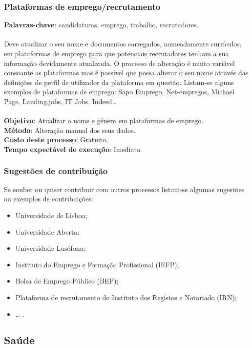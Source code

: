 \subsubsection{Plataformas de emprego/recrutamento}

\textbf{Palavras-chave}: candidaturas, emprego, trabalho, recrutadores. \\
\\
Deve atualizar o seu nome e documentos carregados, nomeadamente
currículos, em plataformas de emprego para que potenciais recrutadores
tenham a sua informação devidamente atualizada. O processo de alteração
é muito variável consoante as plataformas mas é possível que possa
alterar o seu nome através das definições de perfil de utilizador da
plataforma em questão. Listam-se alguns exemplos de plataformas de
emprego: Sapo Emprego, Net-empregos, Michael Page, Landing.jobs, IT
Jobs, Indeed\ldots{} \\
\\
\textbf{Objetivo}: Atualizar o nome e género em plataformas de emprego. \\
\textbf{Método}: Alteração manual dos seus dados. \\
\textbf{Custo deste processo}: Gratuito. \\
\textbf{Tempo expectável de execução}: Imediato. \\

\newpage

\subsubsection{Sugestões de contribuição}

Se souber ou quiser contribuir com outros processos listam-se algumas
sugestões ou exemplos de contribuições:
\begin{itemize}
	\item Universidade de Lisboa;
	\item Universidade Aberta;
	\item Universidade Lusófona;
	\item Instituto do Emprego e Formação Profissional (IEFP);
	\item Bolsa de Emprego Público (BEP);
	\item Plataforma de recrutamento do Instituto dos Registos e Notariado (IRN);
	\item \ldots{} .
\end{itemize}

\subsection{Saúde}

